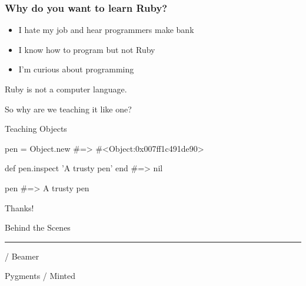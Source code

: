 \documentclass[20pt,draft]{beamer}
\begin{document}
\begin{frame}
	\frametitle{Why do you want to learn Ruby?}

	\begin{itemize}
		\item I hate my job and hear programmers make bank
		\item I know how to program but not Ruby
		\item I'm curious about programming
	\end{itemize}
\end{frame}


\begin{frame}
	\par {Ruby is not a computer language.}
	\vspace{4cm}\pause
	\par {So why are we teaching it like one?}
\end{frame}

\begin{frame}
	\par{ Teaching Objects}
	\par\vspace{3cm}
\end{frame}

\begin{frame}[fragile]
	\begin{rubycode}
pen = Object.new
#=> #<Object:0x007ff1c491de90>

def pen.inspect
'A trusty pen'
end
#=> nil

pen
#=> A trusty pen
	\end{rubycode}
\end{frame}

\begin{frame}
\end{frame}


\begin{frame}
	\begin{center}
		\vspace{2.5cm}
		{Thanks!}
		\vspace{1.5cm}

		Behind the Scenes
		\par\rule[3mm]{3cm}{0.1mm}

		\XeLaTeX / Beamer

		Pygments / Minted
	\end{center}
\end{frame}
\end{document}
